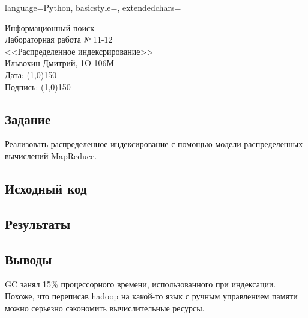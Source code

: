 \documentclass[12pt]{article}
\newcommand{\StudentName}{Ильвохин Дмитрий}
\newcommand{\Group}{1O-106М}
\newcommand{\CourseName}{Информационный поиск}
\newcommand{\LabNum}{11-12}
\newcommand{\Subject}{Распределенное индексрирование}
\begin{document}
\lstset
{
        language=Python,
        basicstyle=\footnotesize,%
        extendedchars=\true
}

\begin{flushright}
\Large{
	\CourseName \\
	Лабораторная работа №\,\LabNum \\
	<<\Subject>> \\
  \StudentName, \Group \\
  Дата: \line(1,0){150} \\
  Подпись: \line(1,0){150} \\
}
\end{flushright}

\subsection*{Задание}
Реализовать распределенное индексирование с помощью модели
распределенных вычислений MapReduce.

\subsection*{Исходный код}


\subsection*{Результаты}


\subsection*{Выводы}
GC занял 15\% процессорного времени, использованного при индексации.
Похоже, что переписав hadoop на какой-то язык с ручным управлением памяти
можно серьезно сэкономить вычислительные ресурсы.
\end{document}
